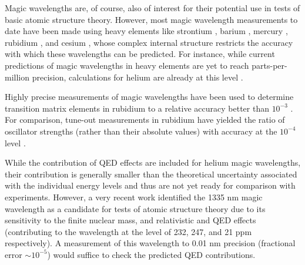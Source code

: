 

	Magic wavelengths are, of course, also of interest for their potential use in tests of basic atomic structure theory.
	However, most magic wavelength measurements to date have been made using heavy elements like strontium \cite{BilickiThesis}, barium \cite{Chanu20}, mercury \cite{Yi11}, rubidium \cite{Herold12}, and cesium \cite{Yoon19}, whose complex internal structure restricts the accuracy with which these wavelengths can be predicted.
	For instance, while current predictions of magic wavelengths in heavy elements are yet to reach parts-per-million precision, calculations for helium are already at this level \cite{Wu18,Zhang21_magic}.
	
	Highly precise measurements of magic wavelengths have been used to determine transition matrix elements in rubidium to a relative accuracy better than $10^{-3}$ \cite{Herold12}.
	For comparison, tune-out measurements in rubidium have yielded the ratio of oscillator strengths (rather than their absolute values) with accuracy at the $10^{-4}$ level \cite{Leonard15}.
	
	While the contribution of QED effects are included for helium magic wavelengths, their contribution is generally smaller than the theoretical uncertainty associated with the individual energy levels and thus are not yet ready for comparison with experiments.
	However, a very recent work identified the 1335 nm magic wavelength as a candidate for tests of atomic structure theory due to its sensitivity to the finite nuclear mass, and relativistic and QED effects \cite{Zhang21_magic} (contributing to the wavelength at the level of 232, 247, and 21 ppm respectively).
	A measurement of this wavelength to 0.01 nm precision (fractional error $\sim10^{-5}$) would suffice to check the predicted QED contributions.
	
